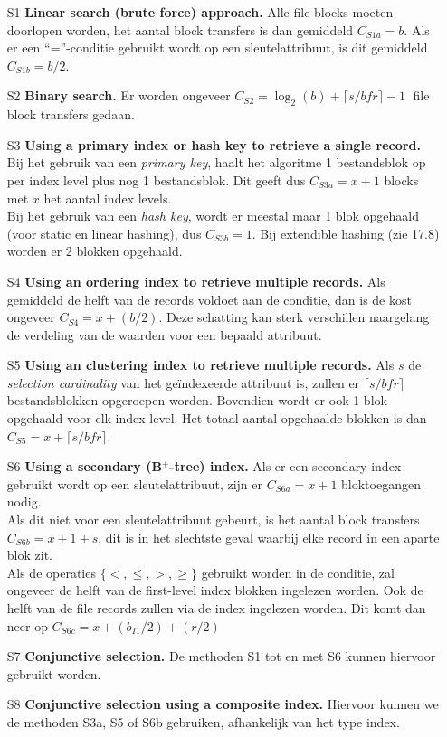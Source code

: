 \begin{enumerate}
	\item[S1] \textbf{Linear search (brute force) approach.} Alle file blocks moeten doorlopen worden, het aantal block transfers is dan gemiddeld $C_{S1a} = b$. Als er een ``=''-conditie gebruikt wordt op een sleutelattribuut, is dit gemiddeld $C_{S1b} = b/2$.

	\item[S2] \textbf{Binary search.} Er worden ongeveer $C_{S2} = \log_2 (b) + \lceil s/\textit{bfr} \rceil - 1\;$ file block transfers gedaan.

	\item[S3] \textbf{Using a primary index or hash key to retrieve a single record.}\\
	Bij het gebruik van een \textit{primary key}, haalt het algoritme 1 bestandsblok op per index level plus nog 1 bestandsblok. Dit geeft dus $C_{S3a} = x+1$ blocks met $x$ het aantal index levels.\\
	Bij het gebruik van een \textit{hash key}, wordt er meestal maar 1 blok opgehaald (voor static en linear hashing), dus $C_{S3b} = 1$. Bij extendible hashing (zie 17.8) worden er 2 blokken opgehaald.

	\item[S4] \textbf{Using an ordering index to retrieve multiple records.} Als gemiddeld de helft van de records voldoet aan de conditie, dan is de kost ongeveer $C_{S4} = x + (b/2)$. Deze schatting kan sterk verschillen naargelang de verdeling van de waarden voor een bepaald attribuut.

	\item[S5] \textbf{Using an clustering index to retrieve multiple records.} Als $s$ de \textit{selection cardinality} van het ge\"indexeerde attribuut is, zullen er $\lceil s/\mathit{bfr} \rceil$ bestandsblokken opgeroepen worden. Bovendien wordt er ook 1 blok opgehaald voor elk index level. Het totaal aantal opgehaalde blokken is dan $C_{S5} = x + \lceil s/\mathit{bfr} \rceil$.

	\item[S6] \textbf{Using a secondary (B$^+$-tree) index.} Als er een secondary index gebruikt wordt op een sleutelattribuut, zijn er $C_{S6a} = x + 1$ bloktoegangen nodig.\\
	Als dit niet voor een sleutelattribuut gebeurt, is het aantal block transfers $C_{S6b} = x + 1 + s$, dit is in het slechtste geval waarbij elke record in een aparte blok zit.\\
	Als de operaties $\{<,\leqslant,>,\geqslant\}$ gebruikt worden in de conditie, zal ongeveer de helft van de first-level index blokken ingelezen worden. Ook de helft van de file records zullen via de index ingelezen worden. Dit komt dan neer op $C_{S6c} = x + (b_{I1}/2) + (r/2)$

	\item[S7] \textbf{Conjunctive selection.} De methoden S1 tot en met S6 kunnen hiervoor gebruikt worden.

	\item[S8] \textbf{Conjunctive selection using a composite index.} Hiervoor kunnen we de methoden S3a, S5 of S6b gebruiken, afhankelijk van het type index.
\end{enumerate}


